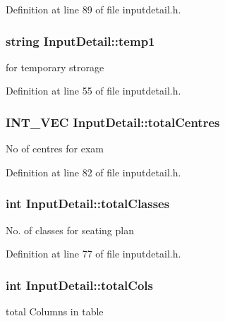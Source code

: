 Definition at line 89 of file inputdetail.\-h.

\hypertarget{classInputDetail_aa5659e496977cc83f743725f6aaf2d6a}{
\subsubsection[{temp1}]{\setlength{\rightskip}{0pt plus 5cm}string Input\-Detail\-::temp1\hspace{0.3cm}{\ttfamily [protected]}}}\label{classInputDetail_aa5659e496977cc83f743725f6aaf2d6a}
for temporary strorage 

Definition at line 55 of file inputdetail.\-h.

\hypertarget{classInputDetail_a11f9eb0c33682bf3c9b1e2cac50ebaad}{
\subsubsection[{total\-Centres}]{\setlength{\rightskip}{0pt plus 5cm}I\-N\-T\-\_\-\-V\-E\-C Input\-Detail\-::total\-Centres\hspace{0.3cm}{\ttfamily [protected]}}}\label{classInputDetail_a11f9eb0c33682bf3c9b1e2cac50ebaad}
No of centres for exam 

Definition at line 82 of file inputdetail.\-h.

\hypertarget{classInputDetail_aac4c49f5453d86c4c79bcb87361ad28d}{
\subsubsection[{total\-Classes}]{\setlength{\rightskip}{0pt plus 5cm}int Input\-Detail\-::total\-Classes\hspace{0.3cm}{\ttfamily [protected]}}}\label{classInputDetail_aac4c49f5453d86c4c79bcb87361ad28d}
No. of classes for seating plan 

Definition at line 77 of file inputdetail.\-h.

\hypertarget{classInputDetail_aeba19a14044746fd0c87b356d05d88c0}{
\subsubsection[{total\-Cols}]{\setlength{\rightskip}{0pt plus 5cm}int Input\-Detail\-::total\-Cols\hspace{0.3cm}{\ttfamily [protected]}}}\label{classInputDetail_aeba19a14044746fd0c87b356d05d88c0}
total Columns in table 

